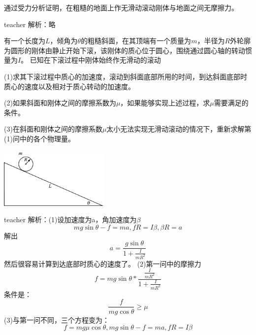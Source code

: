 \begin{example}
通过受力分析证明，在粗糙的地面上作无滑动滚动刚体与地面之间无摩擦力。
\begin{taggedblock}{teacher}
\newline
解析：略
\end{taggedblock}
\end{example}


\begin{example}
有一个长度为$L$，倾角为$\theta$的粗糙斜面，在其顶端有一个质量为$m$，半径为$R$外轮廓为圆形的刚体由静止开始下滚，该刚体的质心位于圆心，围绕通过圆心轴的转动惯量为$I$。
已知在下滚过程中刚体始终作无滑动的滚动

(1)求其下滚过程中质心的加速度，滚动到斜面底部所用的时间，到达斜面底部时质心的速度以及相对于质心转动的加速度。

(2)如果斜面和刚体之间的摩擦系数为$\mu$，如果能够实现上述过程，求$\mu$需要满足的条件。

(3)在斜面和刚体之间的摩擦系数$\mu$太小无法实现无滑动滚动的情况下，重新求解第(1)问中的各个物理量。

\begin{flushright}
\includegraphics[width=0.4\textwidth]{images/rb-problem-1.pdf}
\end{flushright}
\begin{taggedblock}{teacher}
\noindent
解析：(1)设加速度为a，角加速度为$\beta$ \[mg\sin\theta-f=ma,fR=I\beta,\beta R=a\]
解出\[a=\frac{g\sin\theta}{1+\frac{I}{mR^2}}\]
然后很容易计算到达底部时质心的速度了。
(2)第一问中的摩擦力\[f=mg\sin\theta*\frac{\frac{I}{mR^2}}{1+\frac{I}{mR^2}}\]
  条件是：\[\frac{f}{mg\cos\theta}\ge\mu\]
(3)与第一问不同，三个方程变为：\[f=mg\mu\cos\theta,mg\sin\theta-f=ma,fR=I\beta\]

\end{taggedblock}
\end{example}

